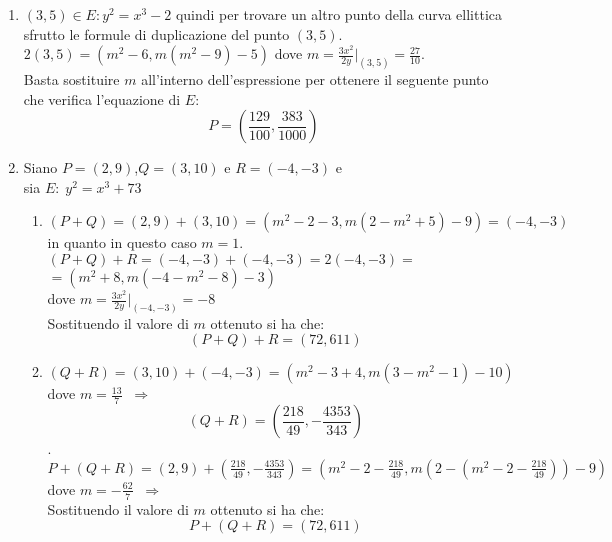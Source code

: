 \documentclass[a4paper]{article}
\newcommand{\ds}{\displaystyle}
\begin{document}
\begin{enumerate}
\begin{enumerate}
Tale identit\'a \'e ottenuta dalla relazione tra le radici e il coefficiente del termine di primo grado trovata nel punto precedente.\\
Sostituendo si ha che:\\
$$x_3=\ds{\frac{m^2x_1+x_1^2-2my_1+x_1x_2+x_1x_3+x_2x_3-2m^2x_1+2my_1}{x_2}}$$
$$x_3=\ds{\frac{-m^2x_1+x_1^2+x_1x_2+x_1x_3+}{x_2}+x_3}$$ \\
A questo punto semplificando gli $x_3$ posso anche semplificare il denominatore ottenendo:\\
$$-m^2x_1+x_1^2+x_1x_2=-x_1x_3\;\;\Rightarrow\;\;$$
$$x_3=m^2-x_1-x_2$$
Da ci\'o si ricava subito che anche la formula per calcolare $y_3$ \'e corretta in quanto riflessione rispetto l'asse delle $x$ del terzo punto di intersezione.
\end{enumerate}



\item $(3,5)\in E: y^2=x^3-2$ quindi per trovare un altro punto della curva ellittica sfrutto le formule di duplicazione del punto $(3,5)$.\\
$2(3,5)=(m^2-6,m(m^2-9)-5)$ dove $m=\ds{\frac{3x^2}{2y}|_{(3,5)}=\frac{27}{10}}$.\\
Basta sostituire $m$ all'interno dell'espressione per ottenere il seguente punto che verifica 
l'equazione di $E$:\\
$$P=\ds{\left(\frac{129}{100},\frac{383}{1000}\right)}$$



\item Siano $P=(2,9)$,$Q=(3,10)$ e $R=(-4,-3)$ e \\
sia $E:\;y^2=x^3+73$
\begin{enumerate}
\item $(P+Q)=(2,9)+(3,10)=(m^2-2-3,m(2-m^2+5)-9)=(-4,-3)$ in quanto in questo caso $m=1$.\\
$(P+Q)+R=(-4,-3)+(-4,-3)=2(-4,-3)=$\\
$=(m^2+8,m(-4-m^2-8)-3)$\\
dove $m=\ds{\frac{3x^2}{2y}|_{(-4,-3)}=-8}$\\
Sostituendo il valore di $m$ ottenuto si ha che:\\
$$(P+Q)+R=(72,611)$$

\item $(Q+R)=(3,10)+(-4,-3)=(m^2-3+4,m(3-m^2-1)-10)$\\ dove $m=\ds{\frac{13}{7}}\;\;\Rightarrow$\\
$$(Q+R)=\ds{\left(\frac{218}{49},-\frac{4353}{343}\right)}$$.\\
$P+(Q+R)=(2,9)+\ds{\left(\frac{218}{49},-\frac{4353}{343}\right)}=
\ds{\left(m^2-2-\frac{218}{49},m\left(2-\left(m^2-2-\frac{218}{49}\right)\right)-9\right)}$\\
dove $m=\ds{-\frac{62}{7}} \;\;\Rightarrow$\\
Sostituendo il valore di $m$ ottenuto si ha che:\\
$$P+(Q+R)=(72,611)$$


\end{enumerate}
\end{enumerate}
\end{document}
